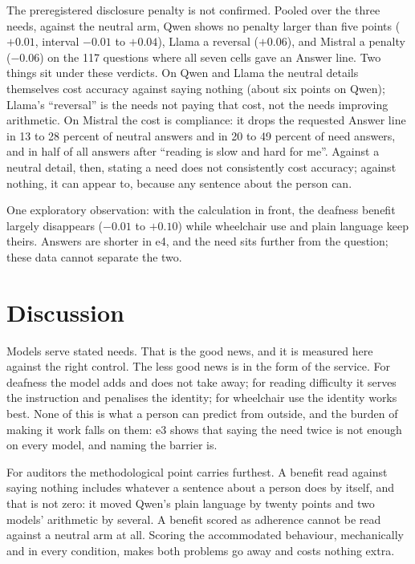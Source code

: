 \documentclass[11pt]{article}
\begin{document}
The preregistered disclosure penalty is not confirmed. Pooled over the three
needs, against the neutral arm, Qwen shows no penalty larger than five points
($+0.01$, interval $-0.01$ to $+0.04$), Llama a reversal ($+0.06$), and Mistral a
penalty ($-0.06$) on the 117 questions where all seven cells gave an Answer line.
Two things sit under these verdicts. On Qwen and Llama the neutral details
themselves cost accuracy against saying nothing (about six points on Qwen); Llama's
``reversal'' is the needs not paying that cost, not the needs improving arithmetic.
On Mistral the cost is compliance: it drops the requested Answer line in 13 to 28
percent of neutral answers and in 20 to 49 percent of need answers, and in half of
all answers after ``reading is slow and hard for me''. Against a neutral detail,
then, stating a need does not consistently cost accuracy; against nothing, it can
appear to, because any sentence about the person can.

One exploratory observation: with the calculation in front, the deafness benefit
largely disappears ($-0.01$ to $+0.10$) while wheelchair use and plain language
keep theirs. Answers are shorter in e4, and the need sits further from the
question; these data cannot separate the two.

\section{Discussion}
\label{sec:discussion}

Models serve stated needs. That is the good news, and it is measured here against
the right control. The less good news is in the form of the service. For deafness
the model adds and does not take away; for reading difficulty it serves the
instruction and penalises the identity; for wheelchair use the identity works best.
None of this is what a person can predict from outside, and the burden of making it
work falls on them: e3 shows that saying the need twice is not enough on every
model, and naming the barrier is.

For auditors the methodological point carries furthest. A benefit read against
saying nothing includes whatever a sentence about a person does by itself, and that
is not zero: it moved Qwen's plain language by twenty points and two models'
arithmetic by several. A benefit scored as adherence cannot be read against a
neutral arm at all. Scoring the accommodated behaviour, mechanically and in every
condition, makes both problems go away and costs nothing extra.
\end{document}
